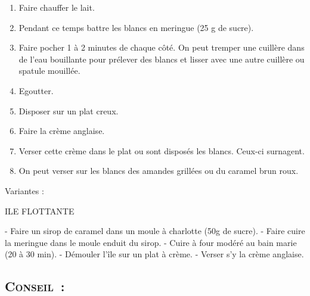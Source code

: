 \begin{enumerate}
\item Faire chauffer le lait.

\item Pendant ce temps battre les blancs en meringue (25 g de sucre).

\item Faire pocher 1 à 2 minutes de chaque côté. On peut tremper une cuillère dans de l'eau bouillante pour prélever des blancs et lisser avec une autre cuillère ou spatule mouillée.

\item Egoutter.

\item Disposer sur un plat creux.

\item Faire la crème anglaise.

\item Verser cette crème dans le plat ou sont disposés les blancs. Ceux-ci surnagent.

\item On peut verser sur les blancs des amandes grillées ou du caramel brun roux.

\end{enumerate}

Variantes :

ILE FLOTTANTE

- Faire un sirop de caramel dans un moule à charlotte (50g de sucre).
- Faire cuire la meringue dans le moule enduit du sirop.
- Cuire à four modéré au bain marie (20 à 30 min).
- Démouler l’île sur un plat à crème.
- Verser s’y la crème anglaise.


\subsection*{\textsc{Conseil~:}}


